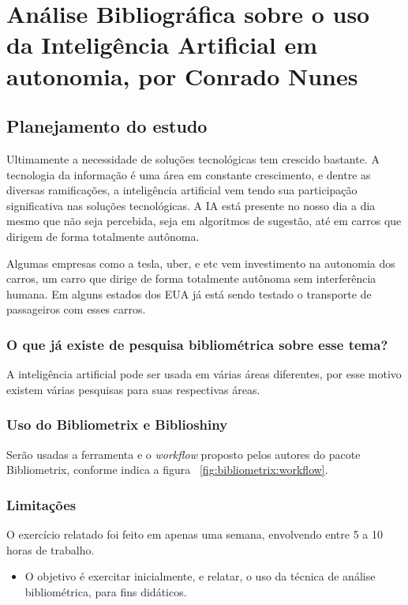 \chapter{Análise Bibliográfica sobre o uso da Inteligência Artificial em autonomia, por Conrado Nunes\label{chap:bibliometria:Conras21}}

\section{Planejamento do estudo}

Ultimamente a necessidade de soluções tecnológicas tem crescido bastante. A tecnologia da informação é uma área em constante crescimento, e dentre as diversas ramificações, a inteligência artificial vem tendo sua participação significativa nas soluções tecnológicas. A IA está presente no nosso dia a dia mesmo que não seja percebida, seja em algoritmos de sugestão, até em carros que dirigem de forma totalmente autônoma.

Algumas empresas como a tesla, uber, e etc vem investimento na autonomia dos carros, um carro que dirige de forma totalmente autônoma sem interferência humana. Em alguns estados dos EUA já está sendo testado o transporte de passageiros com esses carros.

\subsection{O que já existe de pesquisa bibliométrica sobre esse tema?}

A inteligência artificial pode ser usada em várias áreas diferentes, por esse motivo existem várias pesquisas para suas respectivas áreas.

\subsection{Uso do Bibliometrix e Biblioshiny}
Serão usadas a ferramenta e o \textit{workflow} proposto pelos autores do pacote Bibliometrix, conforme indica a figura ~\ref{fig:bibliometrix:workflow}.

\subsection{Limitações} O exercício relatado foi feito em apenas uma semana, envolvendo entre 5 a 10 horas de trabalho.


\begin{itemize}
\item O objetivo é exercitar inicialmente, e relatar, o uso da técnica de análise bibliométrica, para fins didáticos.
\end{itemize}


